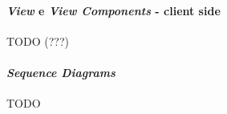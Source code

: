 \hypertarget{view-e-view-components---client-side}{%
\paragraph{\texorpdfstring{\emph{View} e \emph{View Components} - client
side}{View e View Components - client side}}\label{view-e-view-components---client-side}}

TODO (???)

\hypertarget{sequence-diagrams-1}{%
\paragraph{\texorpdfstring{\emph{Sequence
Diagrams}}{Sequence Diagrams}}\label{sequence-diagrams-1}}

TODO

